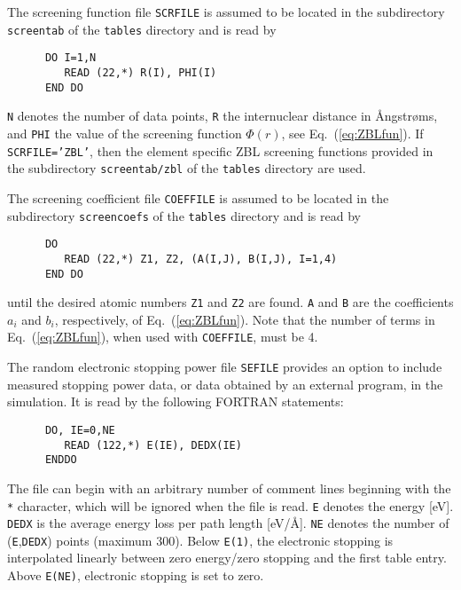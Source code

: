 The screening function file \texttt{SCRFILE} is assumed to be located in the
subdirectory \texttt{screentab} of the \texttt{tables} directory and is read by
%
\begin{verbatim}
      DO I=1,N
         READ (22,*) R(I), PHI(I)
      END DO 
\end{verbatim}
%
\texttt{N} denotes the number of data points, \texttt{R} the internuclear
distance in {\AA}ngstr{\o}ms, and \texttt{PHI} the value of the screening
function $\Phi(r)$, see Eq.~(\ref{eq:ZBLfun}). If \texttt{SCRFILE='ZBL'}, then
the element specific ZBL screening functions provided in the subdirectory
\texttt{screentab/zbl} of the \texttt{tables} directory are used.

The screening coefficient file \texttt{COEFFILE} is assumed to be located in the
subdirectory \texttt{screencoefs} of the \texttt{tables} directory and is read
by
%
\begin{verbatim}
      DO
         READ (22,*) Z1, Z2, (A(I,J), B(I,J), I=1,4)
      END DO 
\end{verbatim}
%
until the desired atomic numbers \texttt{Z1} and \texttt{Z2} are found.
\texttt{A} and \texttt{B} are the coefficients $a_i$ and $b_i$, respectively, of
Eq.~(\ref{eq:ZBLfun}). Note that the number of terms in Eq.~(\ref{eq:ZBLfun}),
when used with \texttt{COEFFILE}, must be 4. 

The random electronic stopping power file \texttt{SEFILE} provides an option to
include measured stopping power data, or data obtained by an external program,
in the simulation. It is read by the following FORTRAN statements:
%
\begin{verbatim}
      DO, IE=0,NE
         READ (122,*) E(IE), DEDX(IE)
      ENDDO
\end{verbatim}
%
The file can begin with an arbitrary number of comment lines beginning with the
\texttt{*} character, which will be ignored when the file is read. \texttt{E}
denotes the energy [eV]. \texttt{DEDX} is the average energy loss per path
length [eV/\AA]. \texttt{NE} denotes the number of (\texttt{E},\texttt{DEDX})
points (maximum 300). Below \texttt{E(1)}, the electronic stopping is
interpolated linearly between zero energy/zero stopping and the first table
entry. Above \texttt{E(NE)}, electronic stopping is set to zero.

